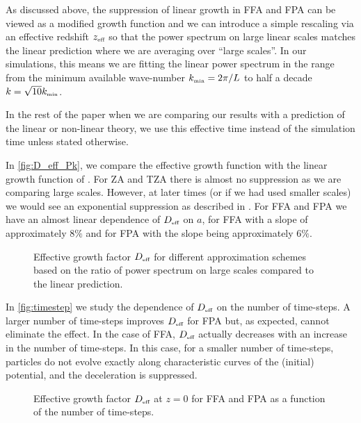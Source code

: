 As discussed above, the suppression of linear growth in FFA and FPA can be viewed as a modified growth function and we can introduce a simple rescaling via an effective redshift $z_\text{\tiny eff}$ so that the power spectrum on large linear scales matches the linear prediction
where we are averaging over ``large scales''. In our simulations, this means we are fitting the linear power spectrum in the range from the minimum available wave-number $k_\text{\tiny min}=2\pi/L$ to half a decade $k=\sqrt{10}k_\text{\tiny min}$.

In the rest of the paper when we are comparing our results with a prediction of the linear or non-linear theory, we use this effective time instead of the simulation time unless stated otherwise.

In \autoref{fig:D_eff_Pk}, we compare the effective growth function with the linear growth function of \LCDM. For ZA and TZA there is almost no suppression as we are comparing large scales. However, at later times (or if we had used smaller scales) we would see an exponential suppression as described in \cite{Bharadwaj_1996}. For FFA and FPA we have an almost linear dependence of $D_\text{\tiny eff}$ on $a$, for FFA with a slope of approximately $8\%$ and for FPA with the slope being approximately $6\%$.
\begin{figure}[bt]
  \centering
    \begin{subfigure}{0.9\textwidth}
	\end{subfigure}
	\begin{subfigure}{0.9\textwidth}
	\end{subfigure}
  \caption{Effective growth factor $D_\text{\tiny eff}$ for different approximation schemes based on the ratio of power spectrum on large scales compared to the linear prediction.}
  \label{fig:D_eff_Pk}
\end{figure}

In \autoref{fig:timestep} we study the dependence of $D_\text{\tiny eff}$ on the number of time-steps. A larger number of time-steps improves $D_\text{\tiny eff}$ for FPA but, as expected, cannot eliminate the effect. In the case of FFA, $D_\text{\tiny eff}$ actually decreases with an increase in the number of time-steps. In this case, for a smaller number of time-steps, particles do not evolve exactly along characteristic curves of the (initial) potential, and the deceleration is suppressed.
\begin{figure}[bt]
  \centering
    \begin{subfigure}{0.9\textwidth}
	\end{subfigure}
	\begin{subfigure}{0.9\textwidth}
	\end{subfigure}
  \caption{Effective growth factor $D_\text{\tiny eff}$ at $z=0$ for FFA and FPA as a function of the number of time-steps.}
  \label{fig:timestep}
\end{figure}

